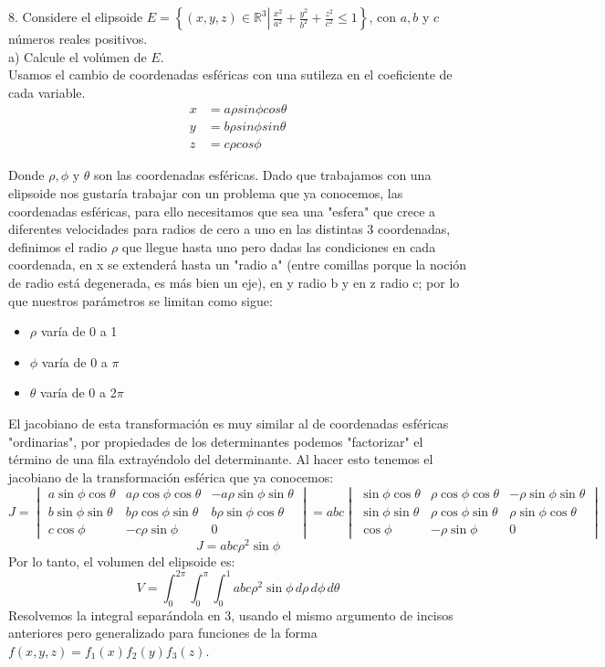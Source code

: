 8. Considere el elipsoide \( E=\left\{(x, y, z) \in \mathbb{R}^{3} \left\lvert\, \frac{x^{2}}{a^{2}}+\frac{y^{2}}{b^{2}}+\frac{z^{2}}{c^{2}} \leq 1\right.\right\} \), con \( a, b \) y \( c \) números reales positivos. \\
a) Calcule el volúmen de \( E \). \\
\aw Usamos el cambio de coordenadas esféricas con una sutileza en el coeficiente de cada variable.
\begin{align*}
    x &= a\rho sin\phi cos\theta \\
y &= b\rho sin\phi sin\theta \\
z &= c\rho cos\phi
\end{align*}

Donde $\rho, \phi \text{  y  } \theta$ son las coordenadas esféricas. Dado que trabajamos con una elipsoide nos gustaría trabajar con un problema que ya conocemos, las coordenadas esféricas, para ello necesitamos que sea una "esfera" que crece a diferentes velocidades para radios de cero a uno en las distintas 3 coordenadas, definimos el radio $\rho$ que llegue hasta uno pero dadas las condiciones en cada coordenada, en x se extenderá hasta un "radio a" (entre comillas porque la noción de radio está degenerada, es más bien un eje), en y radio b y en z radio c; por lo que nuestros parámetros se limitan como sigue:
\begin{itemize}
    \item $\rho$ varía de 0 a 1
    \item $\phi$ varía de 0 a $\pi$
    \item $\theta$ varía de 0 a 2$\pi$
\end{itemize}

El jacobiano de esta transformación es muy similar al de coordenadas esféricas "ordinarias", por propiedades de los determinantes podemos "factorizar" el término de una fila extrayéndolo del determinante. Al hacer esto tenemos el jacobiano de la transformación esférica que ya conocemos:
\[
J = \begin{vmatrix}
a \sin \phi \cos \theta & a \rho \cos \phi \cos \theta & -a \rho \sin \phi \sin \theta \\
b \sin \phi \sin \theta & b \rho \cos \phi \sin \theta & b \rho \sin \phi \cos \theta \\
c \cos \phi & -c \rho \sin \phi & 0
\end{vmatrix} = 
abc\begin{vmatrix}
\sin \phi \cos \theta & \rho \cos \phi \cos \theta & - \rho \sin \phi \sin \theta \\
\sin \phi \sin \theta & \rho \cos \phi \sin \theta & \rho \sin \phi \cos \theta \\
\cos \phi & -\rho \sin \phi & 0
\end{vmatrix} 
\]
\[
J =
abc \rho^2 \sin \phi
\]
Por lo tanto, el volumen del elipsoide es:
\[
V = \int_{0}^{2\pi} \int_{0}^{\pi} \int_{0}^{1} abc \rho^2 \sin \phi \, d\rho \, d\phi \, d\theta
\]
Resolvemos la integral separándola en 3, usando el mismo argumento de incisos anteriores pero generalizado para funciones de la forma $f(x,y,z)=f_1(x)f_2(y)f_3(z)$.\\

